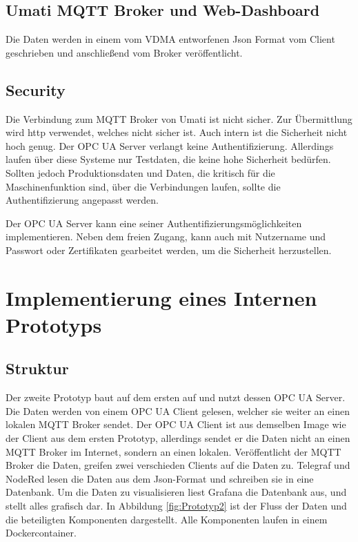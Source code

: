 \documentclass[a4paper, 12pt, oneside, toc=listofnumbered, bibliography=totoc]{scrbook}
\begin{document}
		
		
		\subsection{Umati MQTT Broker und Web-Dashboard}
		
		Die Daten werden in einem vom VDMA entworfenen Json Format vom Client geschrieben und anschließend vom Broker veröffentlicht. 
		
	
		\subsection{Security}
		
		Die Verbindung zum MQTT Broker von Umati ist nicht sicher. Zur Übermittlung wird http verwendet, welches nicht sicher ist. Auch intern ist die Sicherheit nicht hoch genug. Der OPC UA Server verlangt keine Authentifizierung. Allerdings laufen über diese Systeme nur Testdaten, die keine hohe Sicherheit bedürfen. Sollten jedoch Produktionsdaten und Daten, die kritisch für die Maschinenfunktion sind, über die Verbindungen laufen, sollte die Authentifizierung angepasst werden. 
		
		Der OPC UA Server kann eine seiner Authentifizierungsmöglichkeiten implementieren. Neben dem freien Zugang, kann auch mit Nutzername und Passwort oder Zertifikaten gearbeitet werden, um die Sicherheit herzustellen. 
	
	\section{Implementierung eines Internen Prototyps}\label{ch:Implementierung-Intern}
	
		\subsection{Struktur}
		
		Der zweite Prototyp baut auf dem ersten auf und nutzt dessen OPC UA Server. Die Daten werden von einem OPC UA Client gelesen, welcher sie weiter an einen lokalen MQTT Broker sendet. Der OPC UA Client ist aus demselben Image wie der Client aus dem ersten Prototyp, allerdings sendet er die Daten nicht an einen MQTT Broker im Internet, sondern an einen lokalen. Veröffentlicht der MQTT Broker die Daten, greifen zwei verschieden Clients auf die Daten zu. Telegraf und NodeRed lesen die Daten aus dem Json-Format und schreiben sie in eine Datenbank. Um die Daten zu visualisieren liest Grafana die Datenbank aus, und stellt alles grafisch dar. In Abbildung \ref{fig:Prototyp2} ist der Fluss der Daten und die beteiligten Komponenten dargestellt. Alle Komponenten laufen in einem Dockercontainer.
		
\end{document}
